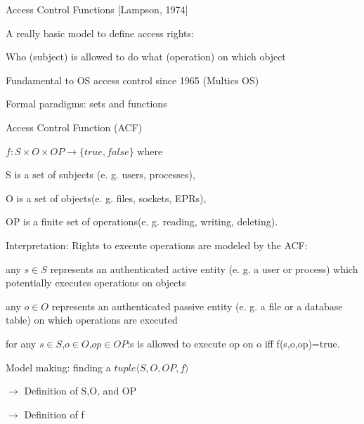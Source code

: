 \documentclass[a4paper]{article}
\begin{document}
\begin{multicols}{3}
    Access Control Functions [Lampson, 1974]
    \begin{itemize*}
        \item A really basic model to define access rights:
              \begin{itemize*}
                  \item Who (subject) is allowed to do what (operation) on which object
                  \item Fundamental to OS access control since 1965 (Multics OS)
                  \item Formal paradigms: sets and functions
              \end{itemize*}
        \item Access Control Function (ACF)
              \begin{itemize*}
                  \item $f:S \times O \times OP \rightarrow \{true,false\}$ where
                  \item S is a set of subjects (e. g. users, processes),
                  \item O is a set of objects(e. g. files, sockets, EPRs),
                  \item OP is a finite set of operations(e. g. reading, writing, deleting).
              \end{itemize*}
        \item Interpretation: Rights to execute operations are modeled by the ACF:
              \begin{itemize*}
                  \item any $s\in S$ represents an authenticated active entity (e. g. a user or process) which potentially executes operations on objects
                  \item any $o\in O$ represents an authenticated passive entity (e. g. a file or a database table) on which operations are executed
                  \item for any $s\in S$,$o\in O$,$op\in OP$:s is allowed to execute op on o iff f(s,o,op)=true.
                  \item Model making: finding a $tuple⟨S,O,OP,f⟩$
                  \item $\rightarrow$  Definition of S,O, and OP
                  \item $\rightarrow$  Definition of f
              \end{itemize*}
    \end{itemize*}


\end{multicols}
\end{document}
